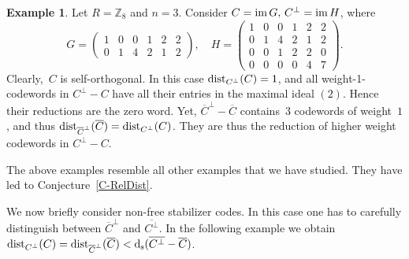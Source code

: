 \documentclass[11pt]{article}
\theoremstyle{definition}
\newtheorem{exa}[theo]{Example}
\numberwithin{equation}{section}
\newcommand{\Z}{{\mathbb Z}}
\newcommand{\im}{\mbox{\rm im}\,}
\newcommand{\ds}{\mbox{${\rm d}_{\rm s}$}}
\newcommand{\ov}[1]{\mbox{$\overline{#1}$}}
\newcommand{\dist}{\textup{dist}}
\begin{document}
\begin{exa}\label{E-FreeSelfOrth}
Let $R=\Z_8$ and $n=3$. Consider $C=\im G,\, C^{\perp}=\im H$, where
\[
   G=\left(\!\!\begin{array}{ccc|ccc}1&0&0&1&2&2\\0&1&4&2&1&2\end{array}\!\!\!\right),\quad
   H=\left(\!\!\begin{array}{ccc|ccc}1&0&0&1&2&2\\0&1&4&2&1&2\\0&0&1&2&2&0\\0&0&0&0&4&7\end{array}\!\!\!\right).
\]
Clearly,~$C$ is self-orthogonal. In this case $\dist_{C^\perp}(C)=1$, and all weight-1-codewords in $C^\perp-C$ have all their entries in the maximal ideal $(2)$.
Hence their reductions are the zero word.
Yet, $\overline{C}^\perp-\ov{C}$ contains~$3$ codewords of weight~$1$, and thus $\dist_{\small{\overline{C}^\perp}}(\ov{C})=\dist_{C^\perp}(C)$.
They are thus the reduction of higher weight codewords in $C^\perp-C$.
\end{exa}

The above examples resemble all other examples that we have studied. They have led to Conjecture~\ref{C-RelDist}.


We now briefly consider non-free stabilizer codes.
In this case one has to carefully distinguish between $\ov{C}^\perp$ and $\ov{C^\perp}$.
In the following example we obtain $\dist_{C^\perp}(C)=\dist_{\small{\overline{C}^\perp}}(\ov{C})<\ds(\ov{C^\perp}-\ov{C})$.
\end{document}
